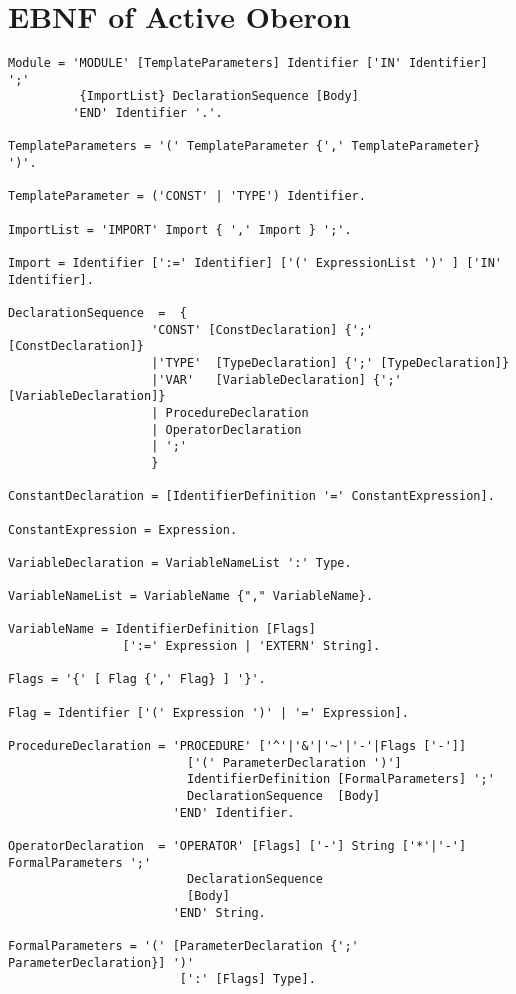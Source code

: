 \documentclass[a4wide,11pt]{article}
\begin{document}
\section{EBNF of Active Oberon}
\label{section:FullEbnf}
\scriptsize
\begin{lstlisting}[style=EBNF]
Module = 'MODULE' [TemplateParameters] Identifier ['IN' Identifier]  ';'
          {ImportList} DeclarationSequence [Body]
         'END' Identifier '.'.

TemplateParameters = '(' TemplateParameter {',' TemplateParameter} ')'.

TemplateParameter = ('CONST' | 'TYPE') Identifier.

ImportList = 'IMPORT' Import { ',' Import } ';'.

Import = Identifier [':=' Identifier] ['(' ExpressionList ')' ] ['IN' Identifier].

DeclarationSequence  =  { 
					'CONST' [ConstDeclaration] {';' [ConstDeclaration]}
					|'TYPE'  [TypeDeclaration] {';' [TypeDeclaration]}
					|'VAR'   [VariableDeclaration] {';' [VariableDeclaration]}
					| ProcedureDeclaration
					| OperatorDeclaration
					| ';'
					}

ConstantDeclaration = [IdentifierDefinition '=' ConstantExpression].

ConstantExpression = Expression.

VariableDeclaration = VariableNameList ':' Type.

VariableNameList = VariableName {"," VariableName}. 

VariableName = IdentifierDefinition [Flags]
                [':=' Expression | 'EXTERN' String].

Flags = '{' [ Flag {',' Flag} ] '}'.

Flag = Identifier ['(' Expression ')' | '=' Expression].

ProcedureDeclaration = 'PROCEDURE' ['^'|'&'|'~'|'-'|Flags ['-']] 
                         ['(' ParameterDeclaration ')']
                         IdentifierDefinition [FormalParameters] ';'
                         DeclarationSequence  [Body] 
                       'END' Identifier.

OperatorDeclaration  = 'OPERATOR' [Flags] ['-'] String ['*'|'-'] FormalParameters ';'
                         DeclarationSequence 
                         [Body] 
                       'END' String.

FormalParameters = '(' [ParameterDeclaration {';' ParameterDeclaration}] ')' 
                        [':' [Flags] Type].


\end{lstlisting}
\end{document}
